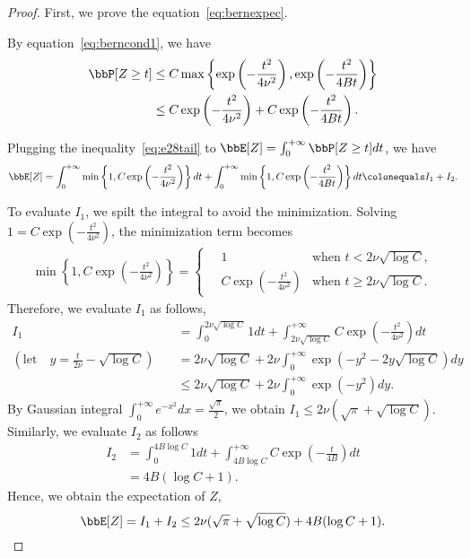 \documentclass[11pt]{article}
\newcommand{\of}[1]{\left(#1\right)}
\newcommand{\offf}[1]{\left\{#1\right\}}
\theoremstyle{plain}
\theoremstyle{definition}
\begin{document}
\begin{proof}
	First, we prove the equation~\eqref{eq:bernexpec}. 
	
	\vspace{0.2cm}
	By equation~\eqref{eq:berncond1}, we have
	\begin{align}
		\bbP[Z \geq t] &\leq C \max \offf{\exp \of{-\frac{t^2}{4 \nu^2}}, \exp \of{-\frac{t^2}{4 Bt}} }\\
		&\leq C \exp \of{-\frac{t^2}{4 \nu^2}} + C \exp \of{-\frac{t^2}{4 Bt}}.\label{eq:e28tail}
	\end{align}
	
	Plugging the inequality~\eqref{eq:e28tail} to $\bbE[Z] = \int_{0}^{+\infty} \bbP[Z \geq t] dt$, we have
	\begin{equation}
		\bbE[Z] = \int_{0}^{+ \infty} \min \offf{1, C \exp \of{-\frac{t^2}{4 \nu^2}}} dt + \int_{0}^{+ \infty} \min\offf{1, C \exp \of{-\frac{t^2}{4 Bt}}} dt   \colonequals I_1 + I_2.
	\end{equation}
	
	To evaluate $I_1$, we spilt the integral to avoid the minimization. Solving $1 = C \exp \of{-\frac{t^2}{4 \nu^2}} $, the minimization term becomes
	\begin{align}
		\min \offf{1, C \exp \of{-\frac{t^2}{4 \nu^2}}} = \begin{cases}
			\quad 1 & \text{when } t < 2\nu \sqrt{\log C},\\
			\quad C \exp \of{-\frac{t^2}{4 \nu^2}} & \text{when } t \geq 2\nu \sqrt{\log C}.
		\end{cases}
	\end{align}
	Therefore, we evaluate $I_1$ as follows,
	\begin{align}
		I_1 &= \int_{0}^{ 2\nu \sqrt{\log C}} 1 dt + \int_{2\nu \sqrt{\log C}}^{+\infty} C \exp \of{-\frac{t^2}{4 \nu^2}} dt\\
		(\text{let}\quad y = \frac{t}{2\nu} - \sqrt{\log C})\quad &=  2\nu \sqrt{\log C} + 2\nu\int_{0}^{+\infty} \exp \of{-y^2 - 2y \sqrt{\log C}} dy\\
		&\leq  2\nu \sqrt{\log C} + 2\nu\int_{0}^{+\infty} \exp \of{-y^2} dy.
	\end{align}
	By Gaussian integral $\int_{0}^{+\infty} e^{-x^2} dx = \frac{\sqrt{\pi}}{2}$, we obtain $I_1 \leq 2\nu (\sqrt{\pi} + \sqrt{\log C})$. Similarly, we evaluate $I_2$ as follows 
	\begin{align}
		I_2 &= \int_{0}^{4B \log C} 1 dt + \int_{4B \log C}^{+\infty} C \exp \of{-\frac{t}{4B}} dt\\
		 &= 4B (\log C + 1).
	\end{align}
	Hence, we obtain the expectation of $Z$,
	\begin{equation}
		\bbE[Z] = I_1 + I_2 \leq  2\nu (\sqrt{\pi} + \sqrt{\log C}) + 4B (\log C + 1).
	\end{equation}
	

\end{proof}
\end{document}
